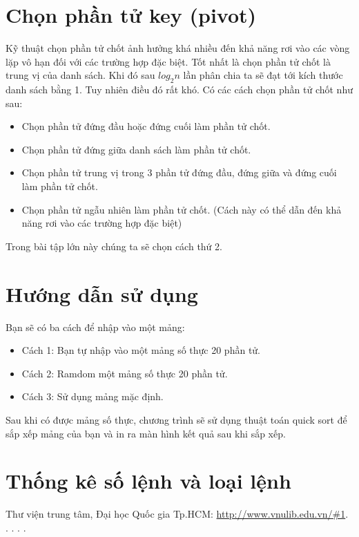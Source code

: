 \documentclass[a4paper]{article}
\begin{document}
\section{Chọn phần tử key (pivot)}
Kỹ thuật chọn phần tử chốt ảnh hưởng khá nhiều đến khả năng rơi vào các vòng lặp vô hạn đối với các trường hợp đặc biệt. Tốt nhất là chọn phần tử chốt là trung vị của danh sách. Khi đó sau $log_2 n$ lần phân chia ta sẽ đạt tới kích thước danh sách bằng 1. Tuy nhiên điều đó rất khó. Có các cách chọn phần tử chốt như sau:
\begin{itemize}
	\item Chọn phần tử đứng đầu hoặc đứng cuối làm phần tử chốt.
	\item Chọn phần tử đứng giữa danh sách làm phần tử chốt.
	\item Chọn phần tử trung vị trong 3 phần tử đứng đầu, đứng giữa và đứng cuối làm phần tử chốt.
	\item Chọn phần tử ngẫu nhiên làm phần tử chốt. (Cách này có thể dẫn đến khả năng rơi vào các trường hợp đặc biệt)	
\end{itemize}
Trong bài tập lớn này chúng ta sẽ chọn cách thứ 2.
\section{Hướng dẫn sử dụng}
Bạn sẽ có ba cách để nhập vào một mảng:
\begin{itemize}
	\item Cách 1: Bạn tự nhập vào một mảng số thực 20 phần tử.
	\item Cách 2: Ramdom một mảng số thực 20 phần tử.
	\item Cách 3: Sử dụng mảng mặc định.
\end{itemize}
Sau khi có được mảng số thực, chương trình sẽ sử dụng thuật toán quick sort để sắp xếp mảng của bạn và in ra màn hình kết quả sau khi sắp xếp.
\section{Thống kê số lệnh và loại lệnh}







\newpage
\begin{thebibliography}{99999}
	 {Thư viện trung tâm, Đại học Quốc gia Tp.HCM: \url{http://www.vnulib.edu.vn/#1}}.
	.
	.
	.
	.
	
\end{thebibliography}
\end{document}
